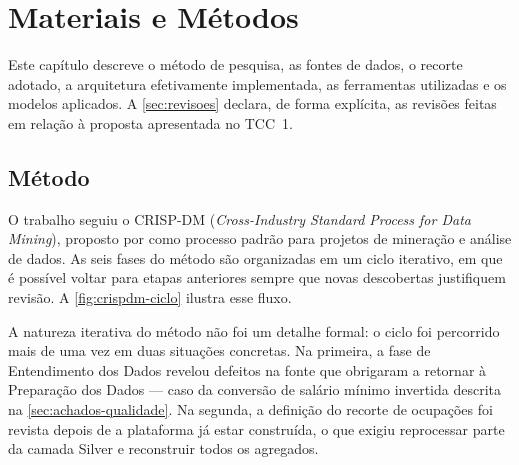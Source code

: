 
\chapter{Materiais e Métodos}
\label{cap:metodologia}

Este capítulo descreve o método de pesquisa, as fontes de dados, o recorte adotado, a arquitetura efetivamente implementada, as ferramentas utilizadas e os modelos aplicados. A \autoref{sec:revisoes} declara, de forma explícita, as revisões feitas em relação à proposta apresentada no TCC~1.

\section{Método}

O trabalho seguiu o CRISP-DM (\textit{Cross-Industry Standard Process for Data Mining}), proposto por  como processo padrão para projetos de mineração e análise de dados. As seis fases do método são organizadas em um ciclo iterativo, em que é possível voltar para etapas anteriores sempre que novas descobertas justifiquem revisão. A \autoref{fig:crispdm-ciclo} ilustra esse fluxo.

A natureza iterativa do método não foi um detalhe formal: o ciclo foi percorrido mais de uma vez em duas situações concretas. Na primeira, a fase de Entendimento dos Dados revelou defeitos na fonte que obrigaram a retornar à Preparação dos Dados --- caso da conversão de salário mínimo invertida descrita na \autoref{sec:achados-qualidade}. Na segunda, a definição do recorte de ocupações foi revista depois de a plataforma já estar construída, o que exigiu reprocessar parte da camada Silver e reconstruir todos os agregados.

